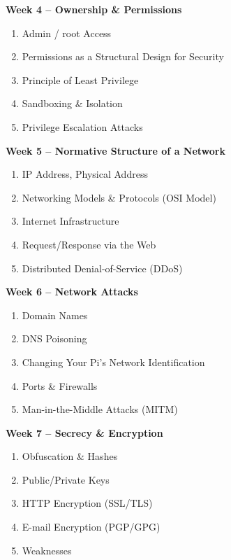 \documentclass[11pt, a4paper]{article}
\begin{document}
\vspace*{.1in}
\noindent\textbf{Week 4 -- Ownership \& Permissions}
\begin{enumerate}
\item Admin / root Access
\item Permissions as a Structural Design for Security
\item Principle of Least Privilege
\item Sandboxing \& Isolation
\item Privilege Escalation Attacks
\end{enumerate}

\vspace*{.1in}
\noindent\textbf{Week 5 -- Normative Structure of a Network}
\begin{enumerate}
\item IP Address, Physical Address
\item Networking Models \& Protocols (OSI Model)
\item Internet Infrastructure
\item Request/Response via the Web
\item Distributed Denial-of-Service (DDoS)
\end{enumerate}

\vspace*{.1in}
\noindent\textbf{Week 6 -- Network Attacks}
\begin{enumerate}
\item Domain Names
\item DNS Poisoning
\item Changing Your Pi's Network Identification
\item Ports \& Firewalls
\item Man-in-the-Middle Attacks (MITM)
\end{enumerate}

\vspace*{.1in}
\noindent\textbf{Week 7 -- Secrecy \& Encryption}
\begin{enumerate}
\item Obfuscation \& Hashes
\item Public/Private Keys
\item HTTP Encryption (SSL/TLS)
\item E-mail Encryption (PGP/GPG)
\item Weaknesses
\end{enumerate}
\end{document}

